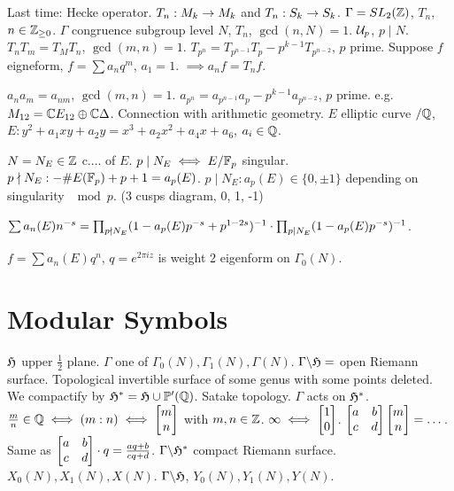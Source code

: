 \documentclass[]{article}
\begin{document}
Last time: Hecke operator. $T_n:M_k \rightarrow M_k$ and $T_n:S_k \rightarrow S_k$. $\Gamma = SL_2(\mathbb{Z})$, $T_n$, $n\in \mathbb{Z}_{\geq 0}$. $\Gamma$ congruence subgroup level $N$, $T_n$, $\gcd(n,N) = 1$. $\mathcal{U}_p$, $p\mid N$.
$T_n T_m = T_M T_n$, $\gcd(m,n) = 1$. $T_{p^n} = T_{p^{n-1}} T_p - p^{k-1} T_{p^{n-2}}$, $p$ prime. Suppose $f$ eigneform, $f = \sum a_n q^m$, $a_1 = 1.$ $\implies a_n f = T_n f$.

$a_n a_m = a_{nm}$, $\gcd(m,n) = 1$. $a_{p^n} = a_{p^{n-1}} a_p - p^{k-1}a_{p^{n-2}}$, $p$ prime. e.g. $M_{12} = \mathbb{C} E_{12} \oplus \mathbb{C} \Delta$. Connection with arithmetic geometry. $E$ elliptic curve $/\mathbb{Q}$, $E: y^2 + a_1 xy + a_2 y = x^3 + a_2 x^2 + a_4x + a_6$, $a_i \in \mathbb{Q}$.

$N = N_E \in\mathbb{Z}$ c.... of $E$. $p\mid N_E \iff E/\mathbb{F}_p$ singular. $p\nmid N_E: -\# E(\mathbb{F}_p) + p + 1 = a_p(E)$. $p\mid N_E: a_p(E) \in \{0,\pm 1\}$ depending on singularity $\mod p$. (3 cusps diagram, 0, 1, -1)

\begin{definition}
	$\sum a_n(E) n^{-s} = \prod_{p\nmid N_E} (1-a_p(E)p^{-s}+p^{1-2s})^{-1} \cdot \prod_{p\mid N_E} (1-a_p(E)p^{-s})^{-1}$.
\end{definition}

\begin{theorem}
	$f = \sum a_n(E)q^n$, $q = e^{2\pi i z}$ is weight 2 eigenform on $\Gamma_0(N)$.
\end{theorem}

\section*{Modular Symbols}

$\frak{H}$ upper $\frac{1}{2}$ plane. $\Gamma$ one of $\Gamma_0(N), \Gamma_1(N), \Gamma(N)$. $\Gamma \backslash \frak{H} = $ open Riemann surface. Topological invertible surface of some genus with some points deleted.
We compactify by $\frak{H}^* = \frak{H} \cup \mathbb{P}'(\mathbb{Q})$. Satake topology.
$\Gamma$ acts on $\frak{H}^*$. $\frac{m}{n} \in \mathbb{Q} \iff (m:n) \iff \begin{bmatrix}m\\n\end{bmatrix}$ with $m,n\in\mathbb{Z}$. $\infty \iff \begin{bmatrix}1\\0\end{bmatrix}$. $\begin{bmatrix}a & b \\ c & d\end{bmatrix} \begin{bmatrix}m\\n\end{bmatrix} = \dots$.
Same as $\begin{bmatrix}a&b\\c&d\end{bmatrix}\cdot q = \frac{aq+b}{cq+d}$.
$\Gamma \backslash \frak{H}^*$ compact Riemann surface. $X_0(N),X_1(N),X(N)$. $\Gamma\backslash\frak{H}$, $Y_0(N),Y_1(N),Y(N)$.
\end{document}

